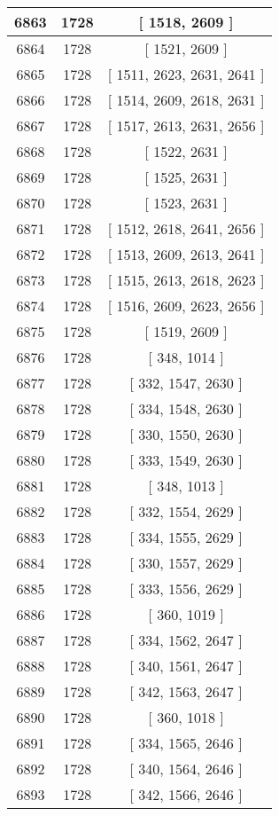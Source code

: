 \begin{center}
\begin{longtable}[H]{|| c c c ||}
\hline
6863 & 1728 & [ 1518, 2609 ] \\ 
\hline
6864 & 1728 & [ 1521, 2609 ] \\ 
\hline
6865 & 1728 & [ 1511, 2623, 2631, 2641 ] \\ 
\hline
6866 & 1728 & [ 1514, 2609, 2618, 2631 ] \\ 
\hline
6867 & 1728 & [ 1517, 2613, 2631, 2656 ] \\ 
\hline
6868 & 1728 & [ 1522, 2631 ] \\ 
\hline
6869 & 1728 & [ 1525, 2631 ] \\ 
\hline
6870 & 1728 & [ 1523, 2631 ] \\ 
\hline
6871 & 1728 & [ 1512, 2618, 2641, 2656 ] \\ 
\hline
6872 & 1728 & [ 1513, 2609, 2613, 2641 ] \\ 
\hline
6873 & 1728 & [ 1515, 2613, 2618, 2623 ] \\ 
\hline
6874 & 1728 & [ 1516, 2609, 2623, 2656 ] \\ 
\hline
6875 & 1728 & [ 1519, 2609 ] \\ 
\hline
6876 & 1728 & [ 348, 1014 ] \\ 
\hline
6877 & 1728 & [ 332, 1547, 2630 ] \\ 
\hline
6878 & 1728 & [ 334, 1548, 2630 ] \\ 
\hline
6879 & 1728 & [ 330, 1550, 2630 ] \\ 
\hline
6880 & 1728 & [ 333, 1549, 2630 ] \\ 
\hline
6881 & 1728 & [ 348, 1013 ] \\ 
\hline
6882 & 1728 & [ 332, 1554, 2629 ] \\ 
\hline
6883 & 1728 & [ 334, 1555, 2629 ] \\ 
\hline
6884 & 1728 & [ 330, 1557, 2629 ] \\ 
\hline
6885 & 1728 & [ 333, 1556, 2629 ] \\ 
\hline
6886 & 1728 & [ 360, 1019 ] \\ 
\hline
6887 & 1728 & [ 334, 1562, 2647 ] \\ 
\hline
6888 & 1728 & [ 340, 1561, 2647 ] \\ 
\hline
6889 & 1728 & [ 342, 1563, 2647 ] \\ 
\hline
6890 & 1728 & [ 360, 1018 ] \\ 
\hline
6891 & 1728 & [ 334, 1565, 2646 ] \\ 
\hline
6892 & 1728 & [ 340, 1564, 2646 ] \\ 
\hline
6893 & 1728 & [ 342, 1566, 2646 ] \\ 

\end{longtable}
\end{center}
